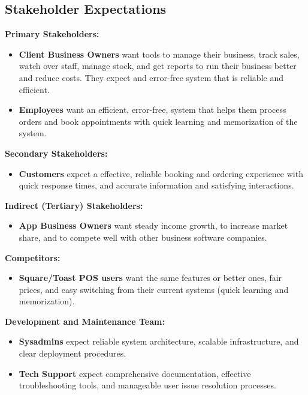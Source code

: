 \documentclass[]{VUMIFTemplateClass}
\begin{document}

\subsection{Stakeholder Expectations}


\textbf{Primary Stakeholders:}
\begin{itemize}
    \item \textbf{Client Business Owners} want tools to manage their business,
    track sales, watch over staff, manage stock, and get reports to run their
    business better and reduce costs. They expect and error-free system that is
    reliable and efficient.
    \item \textbf{Employees} want an efficient, error-free, system that helps
    them process orders and book appointments with quick learning and
    memorization of the system.
\end{itemize}

\textbf{Secondary Stakeholders:}
\begin{itemize}
    \item \textbf{Customers} expect a effective, reliable booking and ordering
    experience with quick response times, and accurate information and
    satisfying interactions.
\end{itemize}

\textbf{Indirect (Tertiary) Stakeholders:}
\begin{itemize}
    \item \textbf{App Business Owners} want steady income growth, to increase
    market share, and to compete well with other business software companies.
\end{itemize}

\textbf{Competitors:}
\begin{itemize}
    \item \textbf{Square/Toast POS users} want the same features or better ones,
    fair prices, and easy switching from their current systems (quick learning and memorization).
\end{itemize}

\textbf{Development and Maintenance Team:}
\begin{itemize}
    \item \textbf{Sysadmins} expect reliable system architecture, scalable
    infrastructure, and clear deployment procedures.
    \item \textbf{Tech Support} expect comprehensive documentation, effective
    troubleshooting tools, and manageable user issue resolution processes.
\end{itemize}
\end{document}
